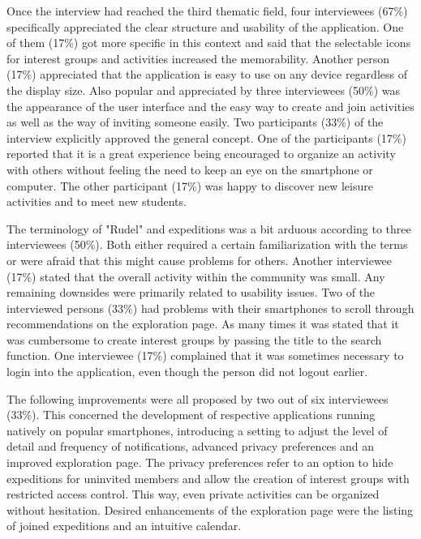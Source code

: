 \documentclass[12pt,numbers=noenddot,parskip,bibliography=totocnumbered,listof=totocnumbered,draft]{scrreprt}
\begin{document}
Once the interview had reached the third thematic field, four interviewees (67\%) specifically appreciated the clear structure and usability of the application. One of them (17\%) got more specific in this context and said that the selectable icons for interest groups and activities increased the memorability. Another person (17\%) appreciated that the application is easy to use on any device regardless of the display size. Also popular and appreciated by three interviewees (50\%) was the appearance of the user interface and the easy way to create and join activities as well as the way of inviting someone easily. Two participants (33\%) of the interview explicitly approved the general concept. One of the participants (17\%) reported that it is a great experience being encouraged to organize an activity with others without feeling the need to keep an eye on the smartphone or computer. The other participant (17\%) was happy to discover new leisure activities and to meet new students.

The terminology of "Rudel" and expeditions was a bit arduous according to three interviewees (50\%). Both either required a certain familiarization with the terms or were afraid that this might cause problems for others. Another interviewee (17\%) stated that the overall activity within the community was small. Any remaining downsides were primarily related to usability issues. Two of the interviewed persons (33\%) had problems with their smartphones to scroll through recommendations on the exploration page. As many times it was stated that it was cumbersome to create interest groups by passing the title to the search function. One interviewee (17\%) complained that it was sometimes necessary to login into the application, even though the person did not logout earlier.

The following improvements were all proposed by two out of six interviewees (33\%). This concerned the development of respective applications running natively on popular smartphones, introducing a setting to adjust the level of detail and frequency of notifications, advanced privacy preferences and an improved exploration page. The privacy preferences refer to an option to hide expeditions for uninvited members and allow the creation of interest groups with restricted access control. This way, even private activities can be organized without hesitation. Desired enhancements of the exploration page were the listing of joined expeditions and an intuitive calendar.
\end{document}
